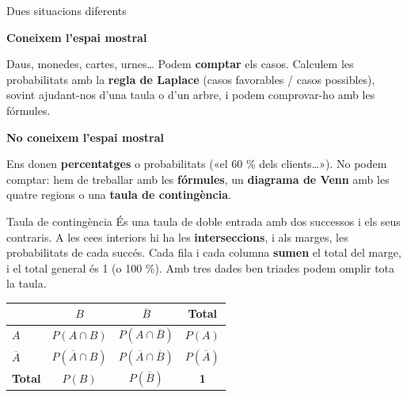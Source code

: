 \documentclass[11pt,a4paper]{article}
\begin{document}
\begin{fmdef}{Dues situacions diferents}
\par\noindent \begin{minipage}[t]{0.488\linewidth}\vspace{0pt}\begin{tcolorbox}[enhanced,colback=fmsurface,colframe=fmmuted!35,arc=2.5mm,boxrule=0.6pt,left=2.5mm,right=2.5mm,top=1.5mm,bottom=1.5mm,before upper=\raggedright,equal height group=cmp1]{\color{fmnavy}\bfseries Coneixem l'espai mostral}\par

Daus, monedes, cartes, urnes\dots{} Podem \textbf{comptar} els casos. Calculem les probabilitats amb la \textbf{regla de Laplace} (casos favorables / casos possibles), sovint ajudant-nos d'una taula o d'un arbre, i podem comprovar-ho amb les fórmules.\end{tcolorbox}\end{minipage}\hfill\begin{minipage}[t]{0.488\linewidth}\vspace{0pt}\begin{tcolorbox}[enhanced,colback=fmsurface,colframe=fmmuted!35,arc=2.5mm,boxrule=0.6pt,left=2.5mm,right=2.5mm,top=1.5mm,bottom=1.5mm,before upper=\raggedright,equal height group=cmp1]{\color{fmnavy}\bfseries No coneixem l'espai mostral}\par

Ens donen \textbf{percentatges} o probabilitats («el 60 \% dels clients\dots{}»). No podem comptar: hem de treballar amb les \textbf{fórmules}, un \textbf{diagrama de Venn} amb les quatre regions o una \textbf{taula de contingència}.\end{tcolorbox}\end{minipage}\par\medskip
\end{fmdef}

\begin{fmdef}{Taula de contingència}
És una taula de doble entrada amb dos successos i els seus contraris. A les ce\lgem{}es interiors hi ha les \textbf{interseccions}, i als marges, les probabilitats de cada succés. Cada fila i cada columna \textbf{sumen} el total del marge, i el total general és 1 (o 100 \%). Amb tres dades ben triades podem omplir tota la taula.

\begin{center}\renewcommand{\arraystretch}{1.55}\setlength{\tabcolsep}{9pt}\begin{tabular}{l|cc|c}\toprule
\textbf{} & \textbf{$B$} & \textbf{$\overline{B}$} & \textbf{Total}\\\midrule
\textbf{$A$} & $P(A\cap B)$ & $P(A\cap\overline{B})$ & \textbf{$P(A)$}\\
\textbf{$\overline{A}$} & $P(\overline{A}\cap B)$ & $P(\overline{A}\cap\overline{B})$ & \textbf{$P(\overline{A})$}\\
\midrule\textbf{Total} & \textbf{$P(B)$} & \textbf{$P(\overline{B})$} & \textbf{1}\\
\bottomrule\end{tabular}\end{center}
\end{fmdef}
\end{document}
